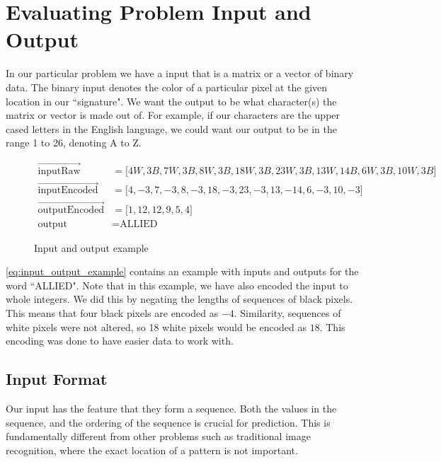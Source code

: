 \section{Evaluating Problem Input and Output}
\label{sec:evaluating_problem_input_and_output}
In our particular problem we have a input that is a matrix or a vector of binary data. The binary input denotes the color of a particular pixel at the given location in our ``signature". We want the output to be what character(s) the matrix or vector is made out of. For example, if our characters are the upper cased letters in the English language, we could want our output to be in the range 1 to 26, denoting A to Z. 

\begin{figure}[h]
    \begin{equation}
        \label{eq:input_output_example}
        \begin{aligned}
           \vec{\text{inputRaw}}               &= \lbrack 4W, 3B, 7W, 3B, 8W, 3B, 18W, 3B, 23W, 3B, 13W, 14B, 6W, 3B, 10W, 3B \rbrack \\
           \vec{\text{inputEncoded}}           &= \lbrack 4, -3, 7, -3, 8, -3, 18, -3, 23, -3, 13, -14, 6, -3, 10, -3 \rbrack \\
           \vec{\text{outputEncoded}}          &= \lbrack 1, 12, 12, 9, 5, 4 \rbrack \\
           \text{output}                       &= \text{ALLIED}
        \end{aligned}
    \end{equation}
    \captionsetup{labelformat=empty}
    \caption{Input and output example}
\end{figure}

\ref{eq:input_output_example} contains an example with inputs and outputs for the word ``ALLIED". Note that in this example, we have also encoded the input to whole integers. We did this by negating the lengths of sequences of black pixels. This means that four black pixels are encoded as $-4$. Similarity, sequences of white pixels were not altered, so 18 white pixels would be encoded as $18$. This encoding was done to have easier data to work with. 

\subsection{Input Format}
Our input has the feature that they form a sequence. Both the values in the sequence, and the ordering of the sequence is crucial for prediction. This is fundamentally different from other problems such as traditional image recognition, where the exact location of a pattern is not important.

